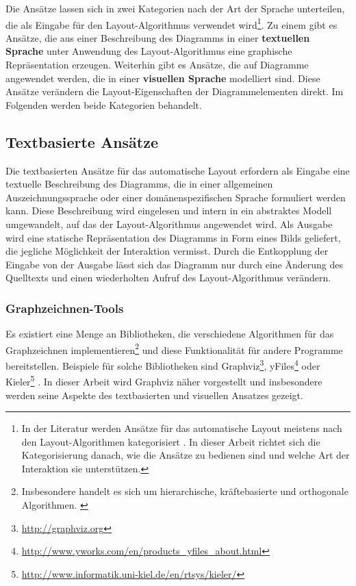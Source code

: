 Die Ansätze lassen sich in zwei Kategorien nach der Art der Sprache unterteilen, die als Eingabe für den Layout-Algorithmus verwendet wird\footnote{In der Literatur werden Ansätze für das automatische Layout meistens nach den Layout-Algorithmen kategorisiert \cite[S.39ff]{Fuhrmann11On-the-Pragmatics} \cite[S.32ff]{Eichelberger05Aesthetics}. In dieser Arbeit richtet sich die Kategorisierung danach, wie die Ansätze zu bedienen sind und welche Art der Interaktion sie unterstützen.}. Zu einem gibt es Ansätze, die aus einer Beschreibung des Diagramms in einer \textbf{textuellen Sprache} unter Anwendung des Layout-Algorithmus eine graphische Repräsentation erzeugen. Weiterhin gibt es Ansätze, die auf Diagramme angewendet werden, die in einer \textbf{visuellen Sprache} modelliert sind. Diese Ansätze verändern die Layout-Eigenschaften der Diagrammelementen direkt. Im Folgenden werden beide Kategorien behandelt.


\subsection{Textbasierte Ansätze}
\label{subsec:text-based-approaches}

Die textbasierten Ansätze für das automatische Layout erfordern als Eingabe eine textuelle Beschreibung des Diagramms, die in einer allgemeinen Auszeichnungssprache oder einer domänenspezifischen Sprache formuliert werden kann. Diese Beschreibung wird eingelesen und intern in ein abstraktes Modell umgewandelt, auf das der Layout-Algorithmus angewendet wird. Als Ausgabe wird eine statische Repräsentation des Diagramms in Form eines Bilds geliefert, die jegliche Möglichkeit der Interaktion vermisst. Durch die Entkopplung der Eingabe von der Ausgabe lässt sich das Diagramm nur durch eine Änderung des Quelltexts und einen wiederholten Aufruf des Layout-Algorithmus verändern.

\subsubsection{Graphzeichnen-Tools}
\label{subsubsec:graph-drawing-tools}

Es existiert eine Menge an Bibliotheken, die verschiedene Algorithmen für das Graphzeichnen implementieren\footnote{Insbesondere handelt es sich um hierarchische, kräftebasierte und orthogonale Algorithmen. \cite{Maier12A-Pattern-based}} und diese Funktionalität für andere Programme bereitstellen. Beispiele für solche Bibliotheken sind Graphviz\footnote{\url{http://graphviz.org}}, yFiles\footnote{\url{http://www.yworks.com/en/products_yfiles_about.html}} oder Kieler\footnote{\url{http://www.informatik.uni-kiel.de/en/rtsys/kieler/}} \cite{Maier12A-Pattern-based}. In dieser Arbeit wird Graphviz näher vorgestellt und insbesondere werden seine Aspekte des textbasierten und visuellen Ansatzes gezeigt.


